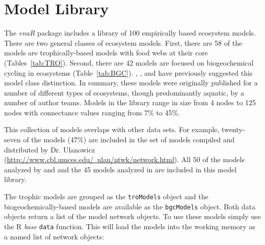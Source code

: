 \documentclass[article]{jss}
\begin{document}
\section{Model Library}

The \textit{enaR} package includes a library of 100 empirically based
ecosystem models. There are two general classes of ecosystem models.
First, there are 58 of the models are trophically-based models with
food webs at their core (Tables~\ref{tab:TRO}).  Second, there are 42
models are focused on biogeochemical cycling in ecosystems
(Table~\ref{tab:BGC}).  \citet{christian96}, \citet{baird08_sylt}, and
\citet{borrett10_idd} have previously suggested this model class
distinction.  In summary, these models were originally published for a
number of different types of ecosystems, though predominantly aquatic,
by a number of author teams.  Models in the library range in size from
4 nodes to 125 nodes with connectance values ranging from 7\% to 45\%.

This collection of models overlaps with other data sets.  For example,
twenty-seven of the models (47\%) are included in the set of models
compiled and distributed by Dr. Ulanowicz
(\href{http://www.cbl.umces.edu/~ulan/ntwk/network.html}{http://www.cbl.umces.edu/~ulan/ntwk/network.html}).
All 50 of the models analyzed by \citet{borrett10_hmg} and
\citet{salas11_did} and the 45 models analyzed in \citet{borrett13}
are included in this model library.

The trophic models are grouped as the \texttt{troModels} object and
the biogeochemically-based models are available as the
\texttt{bgcModels} object.  Both data objects return a list of the
model network objects.  To use these models simply use the R
\textit{base} \texttt{data} function. This will load the models into
the working memory as a named list of network objects:

\begin{Schunk}
\end{Schunk}

\end{document}
